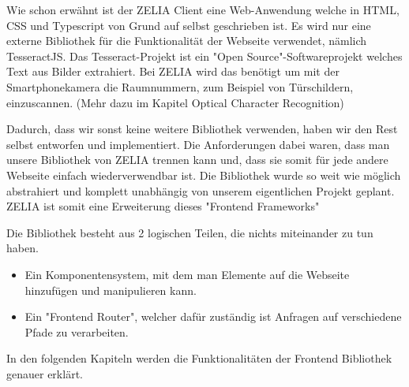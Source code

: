 
Wie schon erwähnt ist der ZELIA Client eine Web-Anwendung welche in HTML, CSS und Typescript von Grund auf selbst geschrieben ist. Es wird nur eine externe Bibliothek für die Funktionalität der Webseite verwendet, nämlich TesseractJS. Das Tesseract-Projekt ist ein "Open Source"-Softwareprojekt welches Text aus Bilder extrahiert. Bei ZELIA wird das benötigt um mit der Smartphonekamera die Raumnummern, zum Beispiel von Türschildern, einzuscannen. (Mehr dazu im Kapitel Optical Character Recognition)

Dadurch, dass wir sonst keine weitere Bibliothek verwenden, haben wir den Rest selbst entworfen und implementiert. Die Anforderungen dabei waren, dass man unsere Bibliothek von ZELIA trennen kann und, dass sie somit für jede andere Webseite einfach wiederverwendbar ist. Die Bibliothek wurde so weit wie möglich abstrahiert und komplett unabhängig von unserem eigentlichen Projekt geplant. ZELIA ist somit eine Erweiterung dieses "Frontend Frameworks"

Die Bibliothek besteht aus 2 logischen Teilen, die nichts miteinander zu tun haben. 
\begin{itemize}
    \item Ein Komponentensystem, mit dem man Elemente auf die Webseite hinzufügen und manipulieren kann. 
    \item Ein "Frontend Router", welcher dafür zuständig ist Anfragen auf verschiedene Pfade zu verarbeiten.
\end{itemize}

In den folgenden Kapiteln werden die Funktionalitäten der Frontend Bibliothek genauer erklärt.